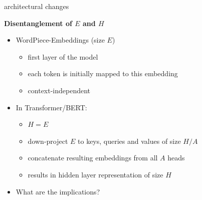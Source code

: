 \documentclass[11pt,compress,t,notes=noshow, xcolor=table]{beamer}
\begin{document}
\begin{frame}{architectural changes}

\vfill

	\textbf{Disentanglement of $E$ and $H$}

	\begin{itemize}
		\item	WordPiece-Embeddings (size $E$) 
			\begin{itemize}
				\item first layer of the model
				\item each token is initially mapped to this embedding
				\item context-independent
			\end{itemize}
		\item In Transformer/BERT: 
			\begin{itemize}
				\item $H = E$
				\item down-project $E$ to keys, queries and values of size $H/A$
				\item concatenate resulting embeddings from all $A$ heads
				\item results in hidden layer representation of size $H$
			\end{itemize}
		\item \ques What are the implications?
	\end{itemize}

\vfill

\end{frame}

\end{document}
